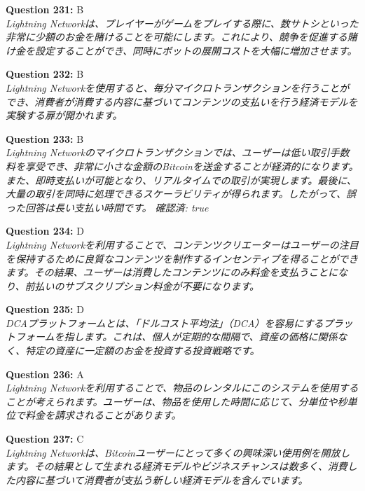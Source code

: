 \documentclass[12pt,a4paper]{article}
\begin{document}
\begin{enumerate}
{{{{{{{{{{\item \textbf{Question 231:} B
\\ \textit{Lightning Networkは、プレイヤーがゲームをプレイする際に、数サトシといった非常に少額のお金を賭けることを可能にします。これにより、競争を促進する賭け金を設定することができ、同時にボットの展開コストを大幅に増加させます。}

\item \textbf{Question 232:} B
\\ \textit{Lightning Networkを使用すると、毎分マイクロトランザクションを行うことができ、消費者が消費する内容に基づいてコンテンツの支払いを行う経済モデルを実験する扉が開かれます。}

\item \textbf{Question 233:} B
\\ \textit{Lightning Networkのマイクロトランザクションでは、ユーザーは低い取引手数料を享受でき、非常に小さな金額のBitcoinを送金することが経済的になります。また、即時支払いが可能となり、リアルタイムでの取引が実現します。最後に、大量の取引を同時に処理できるスケーラビリティが得られます。したがって、誤った回答は長い支払い時間です。
確認済: true}

\item \textbf{Question 234:} D
\\ \textit{Lightning Networkを利用することで、コンテンツクリエーターはユーザーの注目を保持するために良質なコンテンツを制作するインセンティブを得ることができます。その結果、ユーザーは消費したコンテンツにのみ料金を支払うことになり、前払いのサブスクリプション料金が不要になります。}

\item \textbf{Question 235:} D
\\ \textit{DCAプラットフォームとは、「ドルコスト平均法」（DCA）を容易にするプラットフォームを指します。これは、個人が定期的な間隔で、資産の価格に関係なく、特定の資産に一定額のお金を投資する投資戦略です。}

\item \textbf{Question 236:} A
\\ \textit{Lightning Networkを利用することで、物品のレンタルにこのシステムを使用することが考えられます。ユーザーは、物品を使用した時間に応じて、分単位や秒単位で料金を請求されることがあります。}

\item \textbf{Question 237:} C
\\ \textit{Lightning Networkは、Bitcoinユーザーにとって多くの興味深い使用例を開放します。その結果として生まれる経済モデルやビジネスチャンスは数多く、消費した内容に基づいて消費者が支払う新しい経済モデルを含んでいます。}

}}}}}}}}}}
\end{enumerate}
\end{document}
